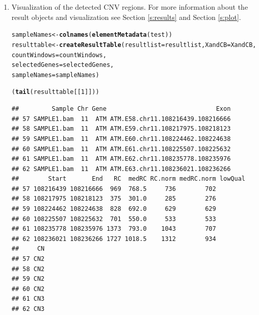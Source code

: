 \documentclass[article]{bioinf}\usepackage[]{graphicx}\usepackage[]{color}
\makeatletter
\newcommand{\hlnum}[1]{\textcolor[rgb]{0.686,0.059,0.569}{#1}}%
\newcommand{\hlstd}[1]{\textcolor[rgb]{0.345,0.345,0.345}{#1}}%
\newcommand{\hlkwb}[1]{\textcolor[rgb]{0.69,0.353,0.396}{#1}}%
\newcommand{\hlkwc}[1]{\textcolor[rgb]{0.333,0.667,0.333}{#1}}%
\newcommand{\hlkwd}[1]{\textcolor[rgb]{0.737,0.353,0.396}{\textbf{#1}}}%
\newenvironment{kframe}{%
 \def\at@end@of@kframe{}%
 \ifinner\ifhmode%
  \def\at@end@of@kframe{\end{minipage}}%
  \begin{minipage}{\columnwidth}%
 \fi\fi%
 \def\FrameCommand##1{\hskip\@totalleftmargin \hskip-\fboxsep
 \colorbox{shadecolor}{##1}\hskip-\fboxsep
     \hskip-\linewidth \hskip-\@totalleftmargin \hskip\columnwidth}%
 \MakeFramed {\advance\hsize-\width
   \@totalleftmargin\z@ \linewidth\hsize
   \@setminipage}}%
 {\par\unskip\endMakeFramed%
 \at@end@of@kframe}
\newenvironment{knitrout}{}{} %
\makeatother
\begin{document}
\begin{enumerate}
\item Visualization of the detected CNV regions. For more information about
the result objects and visualization see Section \ref{s:results} and 
Section \ref{s:plot}.






\begin{knitrout}
\color{fgcolor}\begin{kframe}
\begin{alltt}
\hlstd{sampleNames} \hlkwb{<-} \hlkwd{colnames}\hlstd{(}\hlkwd{elementMetadata}\hlstd{(test))}
\hlstd{resulttable} \hlkwb{<-} \hlkwd{createResultTable}\hlstd{(}\hlkwc{resultlist} \hlstd{= resultlist,} \hlkwc{XandCB} \hlstd{= XandCB,}
                                    \hlkwc{countWindows} \hlstd{= countWindows,}
                                    \hlkwc{selectedGenes} \hlstd{= selectedGenes,}
                                    \hlkwc{sampleNames} \hlstd{= sampleNames)}
\end{alltt}


{\ttfamily\noindent\itshape\color{messagecolor}{\#\# Calculating results for sample(s) SAMPLE1.bam}}

{\ttfamily\noindent\itshape\color{messagecolor}{\#\# Building table...}}

{\ttfamily\noindent\itshape\color{messagecolor}{\#\# Finished}}\begin{alltt}
\hlstd{(}\hlkwd{tail}\hlstd{(resulttable[[}\hlnum{1}\hlstd{]]))}
\end{alltt}
\begin{verbatim}
##         Sample Chr Gene                              Exon
## 57 SAMPLE1.bam  11  ATM ATM.E58.chr11.108216439.108216666
## 58 SAMPLE1.bam  11  ATM ATM.E59.chr11.108217975.108218123
## 59 SAMPLE1.bam  11  ATM ATM.E60.chr11.108224462.108224638
## 60 SAMPLE1.bam  11  ATM ATM.E61.chr11.108225507.108225632
## 61 SAMPLE1.bam  11  ATM ATM.E62.chr11.108235778.108235976
## 62 SAMPLE1.bam  11  ATM ATM.E63.chr11.108236021.108236266
##        Start       End   RC  medRC RC.norm medRC.norm lowQual
## 57 108216439 108216666  969  768.5     736        702        
## 58 108217975 108218123  375  301.0     285        276        
## 59 108224462 108224638  828  692.0     629        629        
## 60 108225507 108225632  701  550.0     533        533        
## 61 108235778 108235976 1373  793.0    1043        707        
## 62 108236021 108236266 1727 1018.5    1312        934        
##     CN
## 57 CN2
## 58 CN2
## 59 CN2
## 60 CN2
## 61 CN3
## 62 CN3
\end{verbatim}
\end{kframe}
\end{knitrout}




\end{enumerate}
\end{document}
